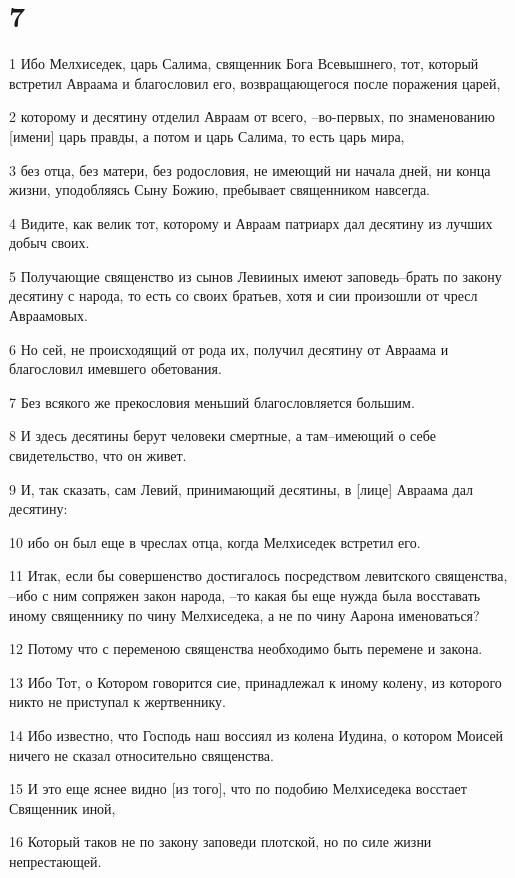 \chapter{7}

\par 1 Ибо Мелхиседек, царь Салима, священник Бога Всевышнего, тот, который встретил Авраама и благословил его, возвращающегося после поражения царей,
\par 2 которому и десятину отделил Авраам от всего, --во-первых, по знаменованию [имени] царь правды, а потом и царь Салима, то есть царь мира,
\par 3 без отца, без матери, без родословия, не имеющий ни начала дней, ни конца жизни, уподобляясь Сыну Божию, пребывает священником навсегда.
\par 4 Видите, как велик тот, которому и Авраам патриарх дал десятину из лучших добыч своих.
\par 5 Получающие священство из сынов Левииных имеют заповедь--брать по закону десятину с народа, то есть со своих братьев, хотя и сии произошли от чресл Авраамовых.
\par 6 Но сей, не происходящий от рода их, получил десятину от Авраама и благословил имевшего обетования.
\par 7 Без всякого же прекословия меньший благословляется большим.
\par 8 И здесь десятины берут человеки смертные, а там--имеющий о себе свидетельство, что он живет.
\par 9 И, так сказать, сам Левий, принимающий десятины, в [лице] Авраама дал десятину:
\par 10 ибо он был еще в чреслах отца, когда Мелхиседек встретил его.
\par 11 Итак, если бы совершенство достигалось посредством левитского священства, --ибо с ним сопряжен закон народа, --то какая бы еще нужда была восставать иному священнику по чину Мелхиседека, а не по чину Аарона именоваться?
\par 12 Потому что с переменою священства необходимо быть перемене и закона.
\par 13 Ибо Тот, о Котором говорится сие, принадлежал к иному колену, из которого никто не приступал к жертвеннику.
\par 14 Ибо известно, что Господь наш воссиял из колена Иудина, о котором Моисей ничего не сказал относительно священства.
\par 15 И это еще яснее видно [из того], что по подобию Мелхиседека восстает Священник иной,
\par 16 Который таков не по закону заповеди плотской, но по силе жизни непрестающей.
